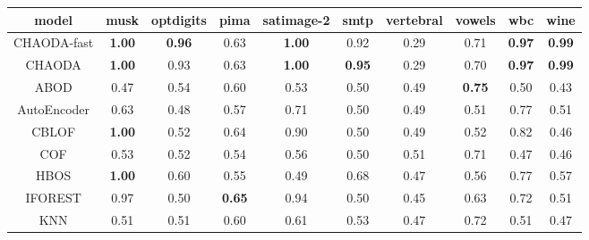 \begin{table*}[!t]
\begin{center}
\begin{small}
\begin{sc}
\begin{tabular}{|c|c|c|c|c|c|c|c|c|c|}
\hline
\textbf{model} & \textbf{musk} & \textbf{optdigits} & \textbf{pima} & \textbf{satimage-2} & \textbf{smtp} & \textbf{vertebral} & \textbf{vowels} &  \textbf{wbc} & \textbf{wine} \\
\hline
        CHAODA-fast & \textbf{1.00} &      \textbf{0.96} &          0.63 &       \textbf{1.00} &          0.92 &               0.29 &            0.71 & \textbf{0.97} & \textbf{0.99} \\
\hline
        CHAODA & \textbf{1.00} &               0.93 &          0.63 &       \textbf{1.00} & \textbf{0.95} &               0.29 &            0.70 & \textbf{0.97} & \textbf{0.99} \\
\hline
                ABOD &          0.47 &               0.54 &          0.60 &                0.53 &          0.50 &               0.49 &   \textbf{0.75} &          0.50 &          0.43 \\
\hline
        AutoEncoder &          0.63 &               0.48 &          0.57 &                0.71 &          0.50 &               0.49 &            0.51 &          0.77 &          0.51 \\
\hline
                CBLOF & \textbf{1.00} &               0.52 &          0.64 &                0.90 &          0.50 &               0.49 &            0.52 &          0.82 &          0.46 \\
\hline
                COF &          0.53 &               0.52 &          0.54 &                0.56 &          0.50 &               0.51 &            0.71 &          0.47 &          0.46 \\
\hline
                HBOS & \textbf{1.00} &               0.60 &          0.55 &                0.49 &          0.68 &               0.47 &            0.56 &          0.77 &          0.57 \\
\hline
        IFOREST &          0.97 &               0.50 & \textbf{0.65} &                0.94 &          0.50 &               0.45 &            0.63 &          0.72 &          0.51 \\
\hline
                KNN &          0.51 &               0.51 &          0.60 &                0.61 &          0.53 &               0.47 &            0.72 &          0.51 &          0.47 \\

\end{tabular}
\end{sc}
\end{small}
\end{center}
\end{table*}
